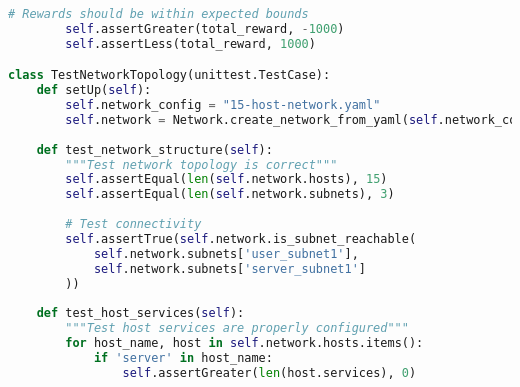 \documentclass[12pt,a4paper]{article}
\begin{document}
\begin{lstlisting}[language=Python, caption=Comprehensive Testing Suite]
        # Rewards should be within expected bounds
        self.assertGreater(total_reward, -1000)
        self.assertLess(total_reward, 1000)

class TestNetworkTopology(unittest.TestCase):
    def setUp(self):
        self.network_config = "15-host-network.yaml"
        self.network = Network.create_network_from_yaml(self.network_config)
    
    def test_network_structure(self):
        """Test network topology is correct"""
        self.assertEqual(len(self.network.hosts), 15)
        self.assertEqual(len(self.network.subnets), 3)
        
        # Test connectivity
        self.assertTrue(self.network.is_subnet_reachable(
            self.network.subnets['user_subnet1'],
            self.network.subnets['server_subnet1']
        ))
    
    def test_host_services(self):
        """Test host services are properly configured"""
        for host_name, host in self.network.hosts.items():
            if 'server' in host_name:
                self.assertGreater(len(host.services), 0)
\end{lstlisting}
\end{document}
